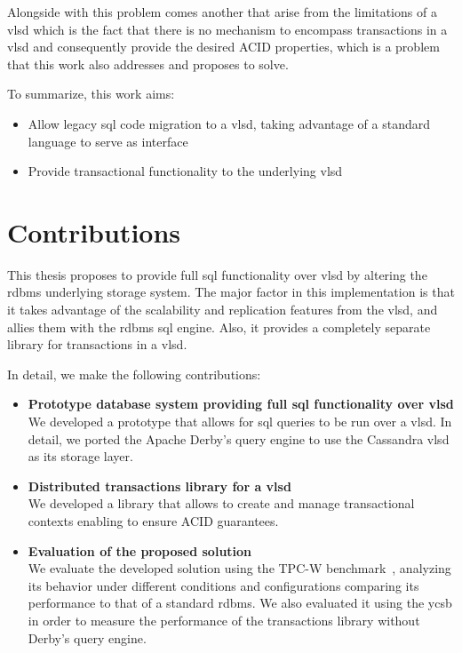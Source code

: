 Alongside with this problem comes another that arise from the limitations of a \ac{vlsd} which is the fact that there is no mechanism to encompass transactions in a \ac{vlsd} and consequently provide the desired ACID properties, which is a problem that this work also addresses and proposes to solve.

To summarize, this work aims:

\begin{itemize}
	\item Allow legacy \ac{sql} code migration to a \ac{vlsd}, taking advantage of a standard language to serve as interface
	\item Provide transactional functionality to the underlying \ac{vlsd}
\end{itemize}

\section{Contributions}

This thesis proposes to provide full \ac{sql} functionality over \ac{vlsd} by altering the \ac{rdbms} underlying storage system.
The major factor in this implementation is that it takes advantage of the scalability and replication features from the \ac{vlsd}, and allies them with the \ac{rdbms} \ac{sql} engine. Also, it provides a completely separate library for transactions in a \ac{vlsd}. 

In detail, we make the following contributions:

\begin{itemize}
	\item \textbf{Prototype database system providing full \ac{sql} functionality over \ac{vlsd}}\\
	   We developed a prototype that allows for \ac{sql} queries to be run over a \ac{vlsd}. In detail, we ported the Apache Derby's query engine to use the Cassandra \ac{vlsd} as its storage layer.
		
	\item \textbf{Distributed transactions library for a \ac{vlsd}}\\
		We developed a library that allows to create and manage transactional contexts enabling to ensure ACID guarantees. 
		
	\item \textbf{Evaluation of the proposed solution}\\
		We evaluate the developed solution using the TPC-W benchmark~\cite{tpcw}, analyzing its behavior under different conditions and configurations comparing its performance to that of a standard \ac{rdbms}. We also evaluated it using the \ac{ycsb} in order to measure the performance of the transactions library without Derby's query engine.
\end{itemize}



